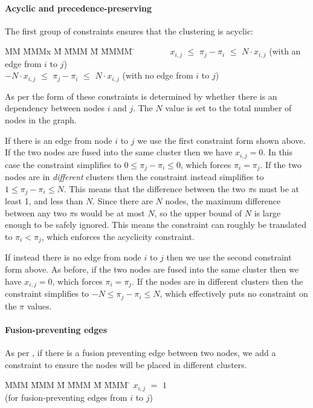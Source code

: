 \paragraph{Acyclic and precedence-preserving} The first group of constraints ensures that the clustering is acyclic:
\begin{tabbing}
MM  \= MMMx \= M \= MMM \= M \= MMMM \= \kill
    \> ~~~~~~~ $x_{i,j}$ \> $\le$ \> $\pi_j - \pi_i$ \> $\le$ \> $N \cdot x_{i,j}$ 
    \>             (with an edge from $i$ to $j$)            \\
    \> $-N \cdot  x_{i,j}$  \> $\le$ \> $\pi_j - \pi_i$ \> $\le$ \> $N \cdot x_{i,j}$ 
    \>             (with no edge from $i$ to $j$)
\end{tabbing}

As per \citet{megiddo1998optimal} the form of these constraints is determined by whether there is an dependency between nodes $i$ and $j$. The $N$ value is set to the total number of nodes in the graph.

If there is an edge from node $i$ to $j$ we use the first constraint form shown above. If the two nodes are fused into the same cluster then we have $x_{i,j} = 0$. In this case the constraint simplifies to $0 \le \pi_j - \pi_i \le 0$, which forces $\pi_i = \pi_j$. If the two nodes are in \emph{different} clusters then the constraint instead simplifies to $1 \le \pi_j - \pi_i \le N$. This means that the difference between the two $\pi$s must be at least 1, and less than $N$. Since there are $N$ nodes, the maximum difference between any two $\pi$s would be at most $N$, so the upper bound of $N$ is large enough to be safely ignored. This means the constraint can roughly be translated to $\pi_i < \pi_j$, which enforces the acyclicity constraint.

If instead there is no edge from node $i$ to $j$ then we use the second constraint form above. As before, if the two nodes are fused into the same cluster then we have $x_{i,j} = 0$, which forces $\pi_i = \pi_j$. If the nodes are in different clusters then the constraint simplifies to $-N \le \pi_j - \pi_i \le N$, which effectively puts no constraint on the $\pi$ values.


\paragraph{Fusion-preventing edges} As per \citet{megiddo1998optimal}, if there is a fusion preventing edge between two nodes, we add a constraint to ensure the nodes will be placed in different clusters.
\begin{tabbing}
MMM     \= MMM \= M  \= MMM \= M \= MMM \= \kill
        \> $x_{i,j}$ \> $=$ \> $1$ \>   \> \\
        \> (for fusion-preventing edges from $i$ to $j$) 
\end{tabbing}

